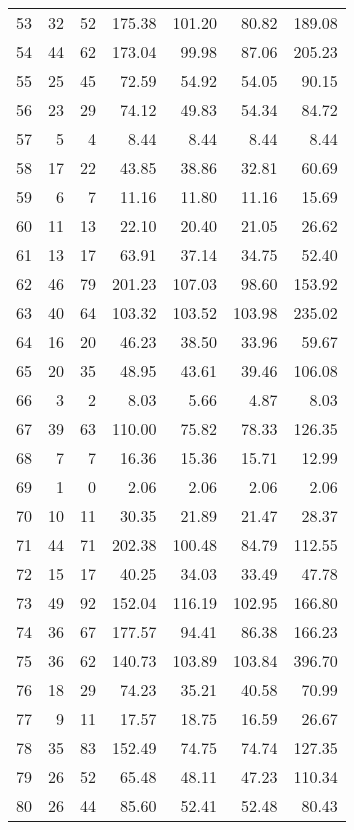 \begin{longtable}{rrrrrrr}
   53 &  32 &  52 & 175.38 & 101.20 & 80.82 & 189.08 \\ 
   54 &  44 &  62 & 173.04 & 99.98 & 87.06 & 205.23 \\ 
   55 &  25 &  45 & 72.59 & 54.92 & 54.05 & 90.15 \\ 
   56 &  23 &  29 & 74.12 & 49.83 & 54.34 & 84.72 \\ 
   57 &   5 &   4 & 8.44 & 8.44 & 8.44 & 8.44 \\ 
   58 &  17 &  22 & 43.85 & 38.86 & 32.81 & 60.69 \\ 
   59 &   6 &   7 & 11.16 & 11.80 & 11.16 & 15.69 \\ 
   60 &  11 &  13 & 22.10 & 20.40 & 21.05 & 26.62 \\ 
   61 &  13 &  17 & 63.91 & 37.14 & 34.75 & 52.40 \\ 
   62 &  46 &  79 & 201.23 & 107.03 & 98.60 & 153.92 \\ 
   63 &  40 &  64 & 103.32 & 103.52 & 103.98 & 235.02 \\ 
   64 &  16 &  20 & 46.23 & 38.50 & 33.96 & 59.67 \\ 
   65 &  20 &  35 & 48.95 & 43.61 & 39.46 & 106.08 \\ 
   66 &   3 &   2 & 8.03 & 5.66 & 4.87 & 8.03 \\ 
   67 &  39 &  63 & 110.00 & 75.82 & 78.33 & 126.35 \\ 
   68 &   7 &   7 & 16.36 & 15.36 & 15.71 & 12.99 \\ 
   69 &   1 &   0 & 2.06 & 2.06 & 2.06 & 2.06 \\ 
   70 &  10 &  11 & 30.35 & 21.89 & 21.47 & 28.37 \\ 
   71 &  44 &  71 & 202.38 & 100.48 & 84.79 & 112.55 \\ 
   72 &  15 &  17 & 40.25 & 34.03 & 33.49 & 47.78 \\ 
   73 &  49 &  92 & 152.04 & 116.19 & 102.95 & 166.80 \\ 
   74 &  36 &  67 & 177.57 & 94.41 & 86.38 & 166.23 \\ 
   75 &  36 &  62 & 140.73 & 103.89 & 103.84 & 396.70 \\ 
   76 &  18 &  29 & 74.23 & 35.21 & 40.58 & 70.99 \\ 
   77 &   9 &  11 & 17.57 & 18.75 & 16.59 & 26.67 \\ 
   78 &  35 &  83 & 152.49 & 74.75 & 74.74 & 127.35 \\ 
   79 &  26 &  52 & 65.48 & 48.11 & 47.23 & 110.34 \\ 
   80 &  26 &  44 & 85.60 & 52.41 & 52.48 & 80.43 \\ 

\end{longtable}
